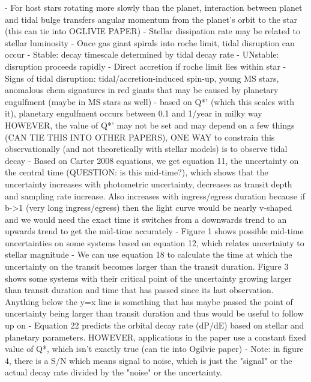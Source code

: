 \documentclass[oneside,12pt]{amsart}
\numberwithin{page}{section}
\begin{document}
\cite{jackson2023metrics}

- For host stars rotating more slowly than the planet, interaction between planet and tidal bulge transfers angular momentum from the planet's orbit to the star (this can tie into OGLIVIE PAPER)
- Stellar dissipation rate may be related to stellar luminosity
- Once gas giant spirals into roche limit, tidal disruption can occur
    - Stable: decay timescale determined by tidal decay rate
    - UNstable: disruption proceeds rapidly
    - Direct accretion if roche limit lies within star
- Signs of tidal disruption: tidal/accretion-induced spin-up, young MS stars, anomalous chem signatures in red giants that may be caused by planetary engulfment (maybe in MS stars as well)
- based on Q*' (which this scales with it), planetary engulfment occurs between 0.1 and 1/year in milky way HOWEVER, the value of Q*' may not be set and may depend on a few things (CAN TIE THIS INTO OTHER PAPERS), ONE WAY to constrain this observationally (and not theoretically with stellar models) is to observe tidal decay
- Based on Carter 2008 equations, we get equation 11, the uncertainty on the central time (QUESTION: is this mid-time?), which shows that the uncertainty increases with photometric uncertainty, decreases as transit depth and sampling rate increase. Also increases with ingress/egress duration because if b->1 (very long ingress/egress) then the light curve would be nearly v-shaped and we would need the exact time it switches from a downwards trend to an upwards trend to get the mid-time accurately
- Figure 1 shows possible mid-time uncertainties on some systems based on equation 12, which relates uncertainty to stellar magnitude
- We can use equation 18 to calculate the time at which the uncertainty on the transit becomes larger than the transit duration. Figure 3 shows some systems with their critical point of the uncertainty growing larger than transit duration and time that has passed since its last observation. Anything below the y=x line is something that has maybe passed the point of uncertainty being larger than transit duration and thus would be useful to follow up on
- Equation 22 predicts the orbital decay rate (dP/dE) based on stellar and planetary parameters. HOWEVER, applications in the paper use a constant fixed value of Q*, which isn't exactly true (can tie into Ogilvie paper)
- Note: in figure 4, there is a S/N which means signal to noise, which is just the "signal" or the actual decay rate divided by the "noise" or the uncertainty.
\end{document}
